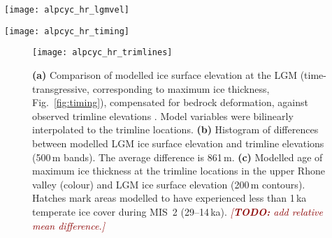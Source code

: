 \documentclass[tc, manuscript]{copernicus}
\newcommand{\todo}[1]{\textcolor{darkred}{\emph{[\textbf{TODO:} #1]}}}
\begin{document}
    \begin{figure*}
      \centerline{\texttt{[image: alpcyc\_hr\_lgmvel]}}
      \caption{%
        \textbf{(a)} Modelled bedrock topography (grey), ice surface topography
        (200\,m contours), and ice surface velocity (blue) in the Alps
        24.57\,ka before present, corresponding to the maximum modelled ice
        cover. Modelled Last Glacial Maximum
        (LGM) ice extent (dashed orange line) and geomorphological
        reconstruction \citep[solid red line,][]{Ehlers.etal.2011}. The
        background map consists of depressed SRTM \citep{Jarvis.etal.2008}
        topography and Natural Earth Data \citep{Patterson.Kelso.2017}.
        \textbf{(b)} Temperature offset time-series from the EPICA ice core
        used as palaeo-climate forcing for the ice flow model \citep[black
        curve,][]{Jouzel.etal.2007}, and modelled total ice volume through the
        last glacial cycle (120--0\,ka), expressed in meters of sea level
        equivalent (m~s.l.e., blue curve). Gray fields indicate Marine
        Oxygen Isotope Stage (MIS) boundaries for MIS~2 and MIS~4 according to
        a~global compilation of benthic  records
        \citep{Lisiecki.Raymo.2005}.}
      \label{fig:lgmvel}
    \end{figure*}

    \begin{figure*}
      \centerline{\texttt{[image: alpcyc\_hr\_timing]}}
      \caption{%
        \textbf{(a)} Timing of the LGM given by the modelled age of maximum ice
        thickness throughout the entire simulation (colour mapping) and
        corresponding, ice surface elevation (200\,m contours).
        \textbf{(b)} Temperature offset time-series from the EPICA ice core
        used as palaeo-climate forcing for the ice flow model (black curve),
        and modelled glacierized area during the LGM (coloured curve). The LGM
        is here modelled as a time-transgressive event.}
      \label{fig:timing}
    \end{figure*}

    \begin{figure}
      \centerline{\texttt{[image: alpcyc\_hr\_trimlines]}}
      \caption{%
        \textbf{(a)} Comparison of modelled ice surface elevation at the LGM
        (time-transgressive, corresponding to maximum ice thickness,
        Fig.~\ref{fig:timing}), compensated for bedrock deformation, against
        observed trimline elevations \citep[Table~1]{Kelly.etal.2004}. Model
        variables were bilinearly interpolated to the trimline locations.
        \textbf{(b)} Histogram of differences between modelled LGM ice surface
        elevation and trimline elevations (500\,m bands). The average
        difference is 861\,m.
        \textbf{(c)} Modelled age of maximum ice thickness at the trimline
        locations \citep[Table~1]{Kelly.etal.2004} in the upper Rhone valley
        (colour) and LGM ice surface elevation (200\,m contours). Hatches
        mark areas modelled to have experienced less than 1\,ka temperate ice
        cover during MIS~2 (29--14\,ka).
        \todo{add relative mean difference.}}
      \label{fig:trimlines}
    \end{figure}
\end{document}
